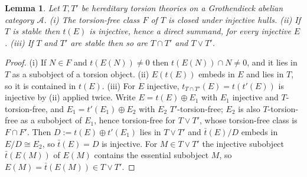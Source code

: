 \documentclass[11pt]{amsart}
\newtheorem{lem}[thm]{Lemma}
\theoremstyle{definition}
\begin{document}
\begin{lem}\label{lem:stable}
Let $T,T'$ be hereditary torsion theories on a Grothendieck abelian
category $\mathcal A$. (i) The torsion-free class $F$ of $T$ is closed under
injective hulls. (ii) If $T$ is stable then $t(E)$ is injective, hence a
direct summand, for every injective $E$. (iii) If $T$ and $T'$ are stable
then so are $T\cap T'$ and $T\vee T'$.
\end{lem}
\begin{proof}
(i) If $N\in F$ and $t(E(N))\neq0$ then $t(E(N))\cap N\neq0$, and it lies in
$T$ as a subobject of a torsion object. (ii) $E(t(E))$ embeds in $E$ and lies
in $T$, so it is contained in $t(E)$. (iii) For $E$ injective,
$t_{T\cap T'}(E)=t(t'(E))$ is injective by (ii) applied twice. Write
$E=t(E)\oplus E_1$ with $E_1$ injective and $T$-torsion-free, and
$E_1=t'(E_1)\oplus E_2$ with $E_2$ $T'$-torsion-free; $E_2$ is also
$T$-torsion-free as a subobject of $E_1$, hence torsion-free for $T\vee T'$,
whose torsion-free class is $F\cap F'$. Then $D:=t(E)\oplus t'(E_1)$ lies in
$T\vee T'$ and $\bar t(E)/D$ embeds in $E/D\cong E_2$, so $\bar t(E)=D$ is
injective. For $M\in T\vee T'$ the injective subobject $\bar t(E(M))$ of
$E(M)$ contains the essential subobject $M$, so $E(M)=\bar t(E(M))\in T\vee
T'$.
\end{proof}
\end{document}
